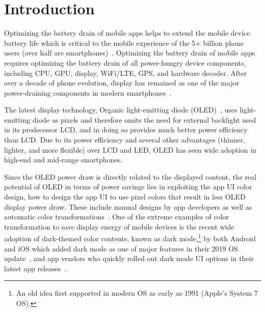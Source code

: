 \vspace{-0.01in}

\section{Introduction}
\label{sec:intro}

Optimizing the battery drain of mobile apps helps to extend the
mobile device battery life which is critical to the mobile experience
of the 5+ billion phone users (over half are smartphones)~\cite{gsma2019}.
Optimizing the battery drain of mobile
apps requires optimizing the battery drain of all power-hungry
device components, including CPU, GPU, display, WiFi/LTE,
GPS, and hardware decoder. After over a decade of phone evolution, display
has remained as one of the major power-draining components in modern
smartphones~\cite{dong2009current,dong:2011chameleon,chen:2013:display,wan:2017:displayenergy,chen:2016:dac,chan:2016:image,crayon:eurosys16}.

The latest display technology, Organic light-emitting diode (OLED)~\cite{oled:2003,oled:2004},
uses light-emitting diode as pixels and therefore omits the need for
external backlight used in its predecessor LCD, and in doing so
provides much better power efficiency than LCD.  Due to its power
efficiency and several other advantages (thinner, lighter, and more
flexible) over LCD and LED, OLED has seen wide adoption in high-end and mid-range
smartphones.

Since the OLED power draw is directly related to the displayed
content, the real potential of OLED in terms of power savings lies in
exploiting the app UI color design, \ie how to design the app UI 
to use pixel colors that result in less OLED display power draw.
These include manual designs by app developers as well as
automatic color transformations~\cite{dong:ispled09,dong:2011chameleon,crayon:eurosys16}.
One of the extreme examples of color transformation to save display energy of mobile
devices is the recent wide adoption of 
dark-themed color contents, known as dark mode,\footnote{An old idea first supported in modern OS as early as 1991 (Apple's System 7 OS).}
by both Android and iOS which added dark mode as one of major
features in their 2019 OS
update~\cite{googledevsummit2018,appleaccouncedarkmode}, and app
vendors who quickly rolled out dark mode UI options in their latest
app releases~\cite{darkModeActicle1,darkModeActicle2,darkModeActicle3,darkModeActicle4,darkModeActicle5,darkModeActicle6,darkModeActicle7}.

